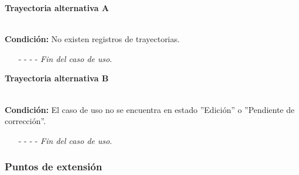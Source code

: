 \hypertarget{CU12-1-1:TAA}{\textbf{Trayectoria alternativa A}}\\
\noindent \textbf{Condición:} No existen registros de trayectorias.
\begin{enumerate}
	\UCpaso[\UCsist] Muestra el mensaje  en la pantalla  para indicar que no hay registros de trayectorias para mostrar. \label{CU12-1-1-TA1}
	\UCpaso[\UCactor] Gestiona las trayectorias a través del botón: . 
	\item[- -] - - {\em {Fin del caso de uso}}.%
\end{enumerate}
\hypertarget{CU12-1-1:TAB}{\textbf{Trayectoria alternativa B}}\\
\noindent \textbf{Condición:} El caso de uso no se encuentra en estado ''Edición'' o ''Pendiente de corrección''.
\begin{enumerate}
	\UCpaso[\UCsist]  Oculta el botón  del caso que no se encuentra en estado de ''Edición'' o ''Pendiente de corrección''.
	\item[- -] - - {\em {Fin del caso de uso}}.
\end{enumerate}

\subsubsection{Puntos de extensión}

